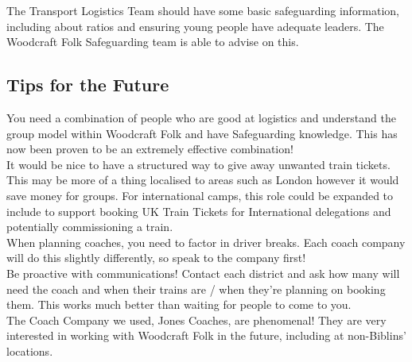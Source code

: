 The Transport Logistics Team should have some basic safeguarding information, including about ratios and ensuring young people have adequate leaders. The Woodcraft Folk Safeguarding team is able to advise on this. 

\subsection{Tips for the Future}
You need a combination of people who are good at logistics and understand the group model within Woodcraft Folk and have Safeguarding knowledge. This has now been proven to be an extremely effective combination!\\

It would be nice to have a structured way to give away unwanted train tickets. This may be more of a thing localised to areas such as London however it would save money for groups. For international camps, this role could be expanded to include to support booking UK Train Tickets for International delegations and potentially commissioning a train.\\

When planning coaches, you need to factor in driver breaks. Each coach company will do this slightly differently, so speak to the company first!\\

Be proactive with communications! Contact each district and ask how many will need the coach and when their trains are / when they're planning on booking them. This works much better than waiting for people to come to you.\\

The Coach Company we used, Jones Coaches, are phenomenal! They are very interested in working with Woodcraft Folk in the future, including at non-Biblins' locations. 
